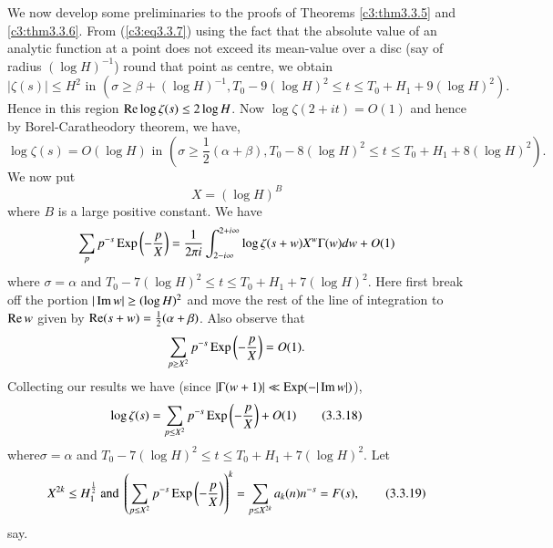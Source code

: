 We now develop some preliminaries to the proofs of Theorems \ref{c3:thm3.3.5} and \ref{c3:thm3.3.6}. From (\ref{c3:eq3.3.7}) using the fact that the absolute value of an analytic function at a point does not exceed its mean-value over a disc (say of radius $(\log H)^{-1}$) round that point as centre, we obtain
{\fontsize{10}{12}\selectfont
$$
|\zeta(s)| \leq H^2 \text{ in }(\sigma \geq \beta + (\log H)^{-1}, T_0
-9 (\log H)^2 \leq  t \leq T_0 + H_1 + 9 (\log H)^2).  
$$}
Hence in this region $\operatorname{Re} \log \zeta(s) \leq 2 \log H$. Now $\log \zeta(2+it) = O(1)$ and hence by Borel-Caratheodory theorem, we have,
{\fontsize{10}{12}\selectfont
$$
\log \zeta(s) = O(\log H) \text{ in } (\sigma \geq \frac{1}{2} (\alpha
+ \beta), T_0 - 8 (\log H)^2 \leq t \leq T_0 + H_1 + 8 (\log H)^2).  
$$}
We now put
\begin{equation*}
X = (\log H)^B \tag{3.3.17}\label{c3:eq3.3.17}
\end{equation*}
where $B$ is a large positive constant. We have
$$
\sum\limits_p p^{-s} \operatorname{Exp} \left(-\frac{p}{X} \right) = \frac{1}{2 \pi i} \int^{2+ i \infty}_{2 - i \infty} \log \zeta(s+w) X^{w} \Gamma (w) dw + O(1)
$$
where $\sigma = \alpha$ and $T_0 - 7 (\log H)^2 \leq t \leq T_0 + H_1 + 7(\log H)^2$. Here first break off the portion $|\operatorname{Im} w | \geq (\log H)^2$ and move the rest of the line of integration to $\operatorname{Re} w$ given by $\operatorname{Re} (s+w) =\frac{1}{2} (\alpha + \beta)$. Also observe that
$$
\sum\limits_{p\geq X^2} p^{-s} \operatorname{Exp} \left( -\frac{p}{X}\right) = O(1) .
$$
Collecting our results we have (since $|\Gamma (w+1)| \ll \operatorname{Exp} (-|\operatorname{Im} w|)$),
\begin{equation*}
\log\zeta(s) = \sum\limits_{p\leq X^2} p^{-s} \operatorname{Exp} \left(-\frac{p}{X} \right) + O(1)  \tag{3.3.18}\label{c3:eq3.3.18}
\end{equation*}
where\pageoriginale $\sigma =\alpha$ and $T_0 - 7 (\log H)^2 \leq t \leq T_0 + H_1 + 7 (\log H)^2$. Let 
\begin{equation*}
X^{2k} \leq H^{\frac{1}{2}}_1\text{ and } \left( \sum\limits_{p \leq X^2} p^{-s} \operatorname{Exp} \left( - \frac{p}{X} \right)\right)^k = \sum\limits_{p\leq X^{2k}} a_k(n) n^{-s} = F(s), \tag{3.3.19}\label{c3:eq3.3.19}
\end{equation*}
say.

